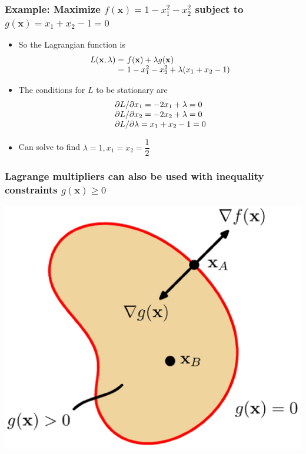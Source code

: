 \documentclass[12pt,notes,mathserif]{beamer}
\begin{document}
\begin{frame}[c]
	\frametitle{Example: Maximize $f(\mathbf{x})=1-x_1^2-x_2^2$ subject to $g(\mathbf{x})=x_1+x_2-1=0$}
	\begin{itemize}
		\item So the Lagrangian function is
		      \[
			      \begin{array}{r@{~}l}
				      L(\mathbf{x},\lambda)= & f(\mathbf{x})+\lambda g(\mathbf{x}) \\
				      =                      & 1-x_1^2-x_2^2+\lambda(x_1+x_2-1)
			      \end{array}
		      \]
		\item The conditions for $L$ to be stationary are
		      \[
			      \begin{array}{l@{~}l}
				      \partial L/\partial x_1=-2x_1+\lambda=0 \\
				      \partial L/\partial x_2=-2x_2+\lambda=0 \\
				      \partial L/\partial \lambda=x_1+x_2-1=0 \\
			      \end{array}
		      \]
		\item Can solve to find $\lambda=1,x_1=x_2=\dfrac{1}{2}$
	\end{itemize}
\end{frame}


\begin{frame}[c]
	\frametitle{Lagrange multipliers can also be used with inequality constraints $g(\mathbf{x})\geqslant{}0$}
	\begin{center}
		\includegraphics[width=0.65\linewidth]{fig8/lec832.jpg}
	\end{center}
\end{frame}
\end{document}
